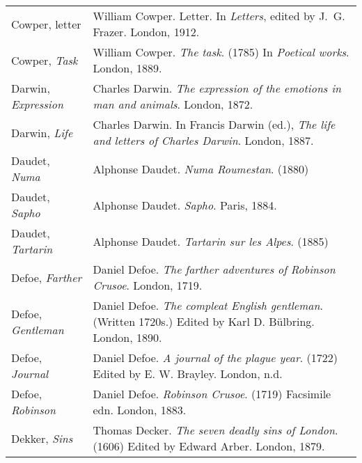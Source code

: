 \begin{longtable}{p{} p{}}
Cowper, letter & William Cowper. Letter. In  \textit{Letters}, edited by J.~G. Frazer. London, 1912.\\ %
Cowper, \textit{Task} & William Cowper. \textit{The task}. (1785) In \textit{Poetical works}. London, 1889. \\

Darwin, \textit{Expression} & Charles Darwin. \textit{The expression of the emotions in man and animals}. London, 1872.  \\
Darwin, \textit{Life} & Charles Darwin. In Francis Darwin (ed.), \textit{The life and letters of Charles Darwin}. London, 1887.  \\

Daudet, \textit{Numa} & Alphonse Daudet. \textit{Numa Roumestan}. (1880) \\
Daudet, \textit{Sapho} & Alphonse Daudet. \textit{Sapho}. Paris, 1884. \\
Daudet, \textit{Tartarin} & Alphonse Daudet. \textit{Tartarin sur les Alpes}. (1885) \\

Defoe, \textit{Farther} & Daniel Defoe. \textit{The farther adventures of Robinson Crusoe}.  London, 1719. \\
Defoe, \textit{Gentleman} & Daniel Defoe. \textit{The compleat English gentleman}. (Written 1720s.) Edited by Karl D. Bülbring. London, 1890.  \\ %
Defoe, \textit{Journal} & Daniel Defoe. \textit{A journal of the plague year}. (1722) Edited by E. W. Brayley. London, n.d. \\
Defoe, \textit{Robinson} & Daniel Defoe. \textit{Robinson Crusoe}. (1719) Facsimile edn. London, 1883. \\

Dekker, \textit{Sins} & Thomas Decker. \textit{The seven deadly sins of London}. (1606) Edited by Edward Arber. London, 1879. \\ %
%


\end{longtable}
